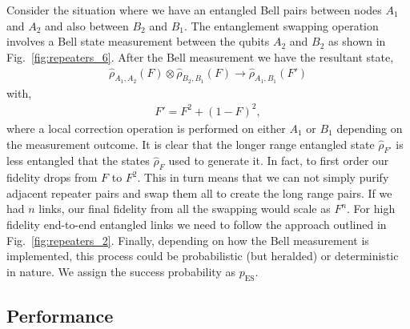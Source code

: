 \documentclass[twocolumn, aps, rmp, amsmath, amssymb, nofootinbib, superscriptaddress, longbibliography, floatfix, table-of-contents, eqsecnum]{revtex4-1}
\newcommand{\comment}[1]{{\color{blue}{\textbf{#1}}}}
\begin{document}
Consider the situation where we have an entangled Bell pairs between nodes $A_1$ and $A_2$ and also between $B_2$ and $B_1$. The entanglement swapping operation involves a Bell state measurement between the qubits $A_2$ and $B_2$ as shown in Fig.~\ref{fig:repeaters_6}. After the Bell measurement we have the resultant state, 
\begin{align}
\hat\rho_{A_1,A_2} (F)\otimes \hat\rho_{B_2,B_1}(F)\rightarrow \hat\rho_{A_1,B_1} (F')
\end{align}
with,
\begin{align}
	F'=F^2+(1-F)^2,
\end{align}
where a local correction operation is performed on either $A_1$ or $B_1$ depending on the measurement outcome. It is clear that the longer range entangled state $\hat\rho_{F'}$ is less entangled that the states $\hat\rho_F$ used to generate it. In fact, to first order our fidelity drops from $F$ to $F^2$. This in turn means that we can not simply purify adjacent repeater pairs and swap them all to create the long range pairs. If we had $n$ links, our final fidelity from all the swapping would scale as $F^n$. For high fidelity end-to-end entangled links we need to follow the approach outlined in Fig.~\ref{fig:repeaters_2}. Finally, depending on how the Bell measurement is implemented, this process could be probabilistic (but heralded) or deterministic in nature. We assign the success probability as $p_\mathrm{ES}$.

\comment{Up to here}

\subsection{Performance}
\end{document}
